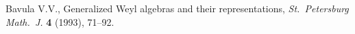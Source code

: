 Bavula V.V., Generalized {W}eyl algebras and their representations,
 \textit{St.~Petersburg Math.~J.} \textbf{4} (1993), 71--92.
